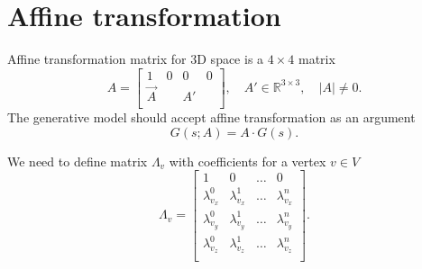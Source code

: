 \section{Affine transformation}

Affine transformation matrix for 3D space is a $4 \times 4$ matrix
\begin{equation}\label{eq:matrix:affine}
  A = \begin{bmatrix}
    1       & 0 & 0  & 0 \\
    \vec{A} &   & A' &   \\
  \end{bmatrix},
  \quad A' \in \mathbb{R}^{3 \times 3},
  \quad \left| A \right| \neq 0.
\end{equation}
The generative model should accept affine transformation as an argument
\begin{equation*}
  G\left( s; A \right) = A \cdot G\left( s \right).
\end{equation*}

We need to define matrix $\Lambda_v$ with coefficients for
a vertex $v \in V$
\begin{equation*}
  \Lambda_v = \begin{bmatrix}
    1               & 0               & \dots & 0 \\
    \lambda^0_{v_x} & \lambda^1_{v_x} & \dots & \lambda^n_{v_x} \\
    \lambda^0_{v_y} & \lambda^1_{v_y} & \dots & \lambda^n_{v_y} \\
    \lambda^0_{v_z} & \lambda^1_{v_z} & \dots & \lambda^n_{v_z} \\
  \end{bmatrix}.
\end{equation*}

